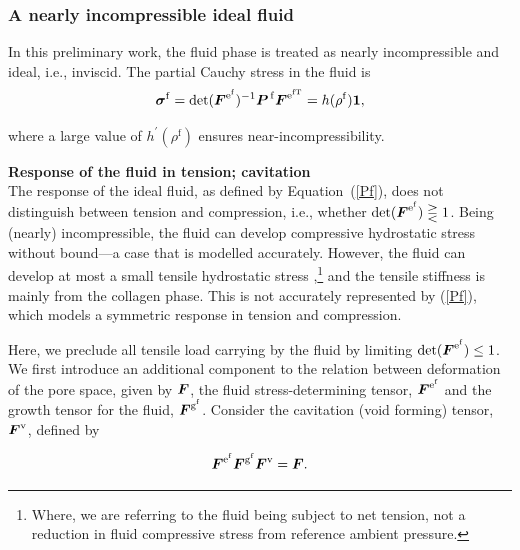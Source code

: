 \subsubsection{A nearly incompressible ideal fluid}
\label{ideal-incompressible-fluid}

In this preliminary work, the fluid phase is treated as nearly
incompressible and ideal, i.e., inviscid. The partial Cauchy
stress in the fluid is
\begin{equation}
\mbox{\boldmath$\sigma$}^\mathrm{f} =
\mathrm{det}(\mbox{\boldmath$ F$}^{\mathrm{e}^\mathrm{f}})^{-1}
\mbox{\boldmath$ P$}^{\,\mathrm{f}}\mbox{\boldmath$ F$}^{\mathrm{e}^\mathrm{fT}} 
= h(\rho^\mathrm{f}){\bf 1},\label{Pf}
\end{equation}

\noindent where a large value of $h^\prime(\rho^\mathrm{f})$ ensures
near-in\-comp\-ress\-i\-bil\-i\-ty. 

{\bf Response of the fluid in tension; cavitation}\\

The response of the ideal fluid, as defined by \mbox{Equation
  (\ref{Pf})}, does not distinguish between tension and compression,
  i.e., whether 
$\mathrm{det}(\mbox{\boldmath$ F$}^{\mathrm{e}^\mathrm{f}}) \gtreqless 1$. Being
(nearly) incompressible, the fluid can develop compressive hydrostatic
  stress
without bound---a case that is modelled accurately. However, the fluid
can develop at most a small tensile hydrostatic stress
\citep{cavitationchris},\footnote{Where, we are referring to the fluid
  being subject to net tension, not a reduction in fluid compressive
  stress from reference ambient pressure.} and the tensile
stiffness is mainly from the collagen phase. This is not accurately
represented by (\ref{Pf}), which models a symmetric response in
tension and compression.

Here, we preclude all tensile load carrying by the fluid by limiting
$\mathrm{det}(\mbox{\boldmath$ F$}^{\mathrm{e}^\mathrm{f}}) \leq 1$. We first introduce
an additional component to the relation between 
deformation of the pore space, given by $\mbox{\boldmath$ F$}$, the fluid
stress-determining tensor, 
$\mbox{\boldmath$ F$}^{\mathrm{e}^\mathrm{f}}$ and the growth tensor for the fluid,
$\mbox{\boldmath$ F$}^{\mathrm{g}^\mathrm{f}}$. Consider the cavitation (void forming) tensor,
$\mbox{\boldmath$ F$}^{\mathrm{v}}$, defined by
  
\begin{equation}
 \mbox{\boldmath$ F$}^{\mathrm{e}^\mathrm{f}}\mbox{\boldmath$ F$}^{\mathrm{g}^\mathrm{f}}
 \mbox{\boldmath$ F$}^{\mathrm{v}} = \mbox{\boldmath$ F$}.
\label{fvoid}
\end{equation}



